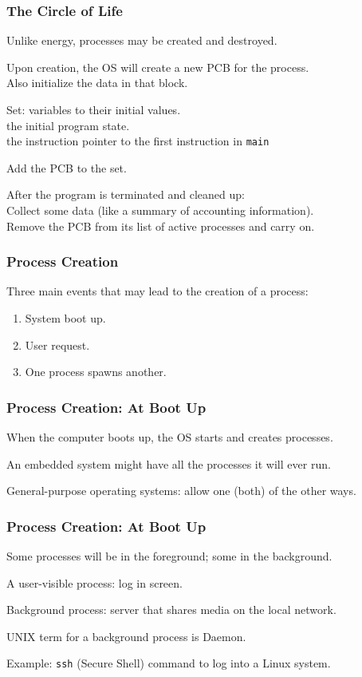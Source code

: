 \begin{frame}
	\frametitle{The Circle of Life}


	Unlike energy, processes may be created and destroyed.

	Upon creation, the OS will create a new PCB for the process.\\
	\quad Also initialize the data in that block.

	Set: variables to their initial values.\\
	\quad the initial program state.\\
	\quad the instruction pointer to the first instruction in \texttt{main}

	Add the PCB to the set.

	After the program is terminated and cleaned up:\\
	\quad Collect some data (like a summary of accounting information).\\
	\quad Remove the PCB from its list of active processes and carry on.


\end{frame}

\begin{frame}
	\frametitle{Process Creation}

	Three main events that may lead to the creation of a process:

	\begin{enumerate}
		\item System boot up.
		\item User request.
		\item One process spawns another.
	\end{enumerate}


\end{frame}

\begin{frame}
	\frametitle{Process Creation: At Boot Up}

	When the computer boots up, the OS starts and creates processes.

	An embedded system might have all the processes it will ever run.

	General-purpose operating systems: allow one (both) of the other ways.


\end{frame}

\begin{frame}
	\frametitle{Process Creation: At Boot Up}

	Some processes will be in the foreground; some in the background.

	A user-visible process: log in screen.

	Background process: server that shares media on the local network.

	UNIX term for a background process is \alert{Daemon}.

	Example: \texttt{ssh} (Secure Shell) command to log into a Linux system.


\end{frame}


